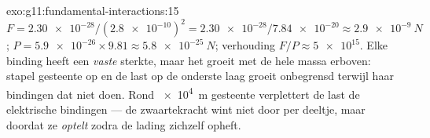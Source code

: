 \begin{solution}{exo:g11:fundamental-interactions:15}
$F = \num{2.30e-28}/(\num{2.8e-10})^2 = \num{2.30e-28}/\num{7.84e-20}
\approx \qty{2.9e-9}{N}$; 
$P = \num{5.9e-26} \times 9.81 \approx \qty{5.8e-25}{N}$; verhouding
$F/P \approx \num{5e15}$. Elke binding heeft een \emph{vaste} sterkte,
maar het  groeit met de hele massa erboven: stapel gesteente op en
de last op de onderste laag groeit onbegrensd terwijl haar bindingen dat
niet doen. Rond \qty{e4}{m} gesteente verplettert de last de elektrische
bindingen --- de zwaartekracht wint niet door  per deeltje, maar
doordat ze \emph{optelt} zodra de lading zichzelf opheft.
\end{solution}

